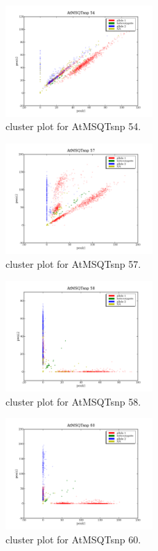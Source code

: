 \begin{figure}[H]
\includegraphics[width=0.5\textwidth]{figures/cluster_plot_AtMSQTsnp_54.png}
\caption{cluster plot for AtMSQTsnp 54.} \label{flAtMSQTsnp54}
\end{figure}
\begin{figure}[H]
\includegraphics[width=0.5\textwidth]{figures/cluster_plot_AtMSQTsnp_57.png}
\caption{cluster plot for AtMSQTsnp 57.} \label{flAtMSQTsnp57}
\end{figure}
\begin{figure}[H]
\includegraphics[width=0.5\textwidth]{figures/cluster_plot_AtMSQTsnp_58.png}
\caption{cluster plot for AtMSQTsnp 58.} \label{flAtMSQTsnp58}
\end{figure}
\begin{figure}[H]
\includegraphics[width=0.5\textwidth]{figures/cluster_plot_AtMSQTsnp_60.png}
\caption{cluster plot for AtMSQTsnp 60.} \label{flAtMSQTsnp60}
\end{figure}
